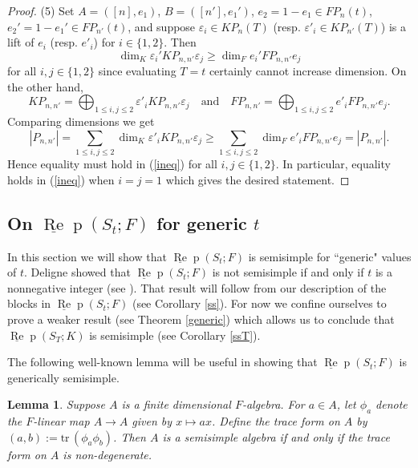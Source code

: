 \documentclass{amsart}
\newtheorem{lemma}[theorem]{Lemma}
\theoremstyle{definition}
\def\uRep{\underline{\operatorname{Re}}\!\operatorname{p}}
\newcommand{\tr}{\text{tr}\,}
\renewcommand{\1}{_{(1)}}
\renewcommand{\2}{_{(2)}}
\newcommand{\3}{_{(3)}}
\newcommand{\4}{_{(4)}}
\newcommand{\ep}{\varepsilon}
\begin{document}
\begin{proof}
(5) Set $A=([n], e_1)$, $B=([n'], e_1')$, $e_2=1-e_1\in FP_n(t)$, $e_2'=1-e_1'\in FP_{n'}(t)$, and suppose $\ep_i\in KP_n(T)$ (resp. $\ep'_i\in KP_{n'}(T)$) is a lift of $e_i$ (resp. $e'_i$) for $i\in\{1,2\}$.  Then \begin{equation}\label{ineq} \dim_K\ep_i'KP_{n,n'}\ep_j\geq \dim_Fe_i' FP_{n,n'}e_j\end{equation} for all $i,j\in\{1,2\}$ since evaluating $T=t$ certainly cannot increase dimension.  On the other hand, $$ KP_{n,n'}=\bigoplus_{1\leq i, j\leq 2}\ep'_iKP_{n,n'}\ep_j\quad\text{and}\quad FP_{n,n'}=\bigoplus_{1\leq i, j\leq 2}e'_iFP_{n,n'}e_j.$$  Comparing dimensions we get $$|P_{n,n'}|=\sum_{1\leq i,j \leq 2}\dim_K\ep'_iKP_{n,n'}\ep_j\geq\sum_{1\leq i,j \leq 2}\dim_Fe'_iFP_{n,n'}e_j=|P_{n,n'}|.$$  Hence equality must hold in (\ref{ineq}) for all $i, j\in\{1,2\}$.  In particular, equality holds in (\ref{ineq}) when $i=j=1$ which gives the desired statement.  
\end{proof}






\subsection{On $ \uRep(S_t; F)$ for generic $t$}\label{genericSt}  In this section we will show that $ \uRep(S_t; F)$ is semisimple for ``generic" values of $t$.  Deligne showed that $ \uRep(S_t; F)$ is not semisimple if and only if $t$ is a nonnegative integer (see \cite{Del07}).  That result will follow from our description of the blocks in $ \uRep(S_t; F)$ (see Corollary \ref{ss}).  For now we confine ourselves to prove a weaker result (see Theorem \ref{generic}) which allows us to conclude that $\uRep(S_T; K)$ is semisimple (see Corollary \ref{ssT}).

The following well-known lemma will be useful in showing that $\uRep(S_t; F)$ is generically semisimple.


\begin{lemma}\label{trform}  Suppose $A$ is a finite dimensional $F$-algebra.  For $a\in A$, let $\phi_a$ denote the $F$-linear map $A\to A$ given by $x\mapsto ax$.  Define the \emph{trace form} on $A$ by $(a, b):=\tr(\phi_a\phi_b)$.  Then $A$ is a semisimple algebra if and only if the trace form on $A$ is non-degenerate.  
\end{lemma}
\end{document}
